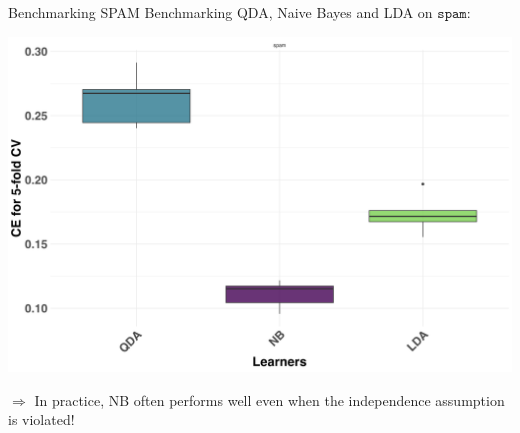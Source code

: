 \documentclass[11pt,compress,t,notes=noshow, xcolor=table]{beamer}
\begin{document}
\begin{vbframe}{Benchmarking SPAM}
Benchmarking QDA, Naive Bayes and LDA on $\texttt{spam}$:

\begin{center}
\includegraphics[clip=true, trim={0 0 0 17}, width=0.80\linewidth]{figure/nb-bench.png}
\end{center}

$\Rightarrow$ In practice, NB often performs well even when the independence assumption is violated!
\end{vbframe}

\endlecture
\end{document}
